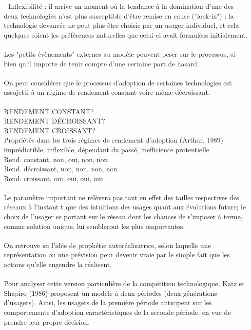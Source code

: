 \documentclass[a4paper, 10pt]{article}
\begin{document}
- Inflexibilité : il arrive un moment où la tendance à la domination d'une des deux technologies n'est plus susceptible d'être remise en cause ("lock-in") :
la technologie devancée ne peut plus être choisie par un usager individuel, et cela quelques soient les préférences naturelles que celui-ci avait formulées initialement.\\ \\
Les "petits évènements" externes au modèle peuvent peser sur le processus, si bien qu'il importe de tenir compte d'une certaine part de hasard.\\ \\
On peut considérer que le processus d'adoption de certaines technologies est assujetti à un régime de rendement constant voire même décroissant.\\ \\
RENDEMENT CONSTANT?\\
RENDEMENT DÉCROISSANT?\\
RENDEMENT CROISSANT?\\
Propriétés dans les trois régimes de rendement d'adoption (Arthur, 1989)\\
imprédictible, inflexible, dépendant du passé, inefficience protentielle\\
Rend. constant, non, oui, non, non\\
Rend. décroissant, non, non, non, non\\
Rend. croissant, oui, oui, oui, oui\\ \\
Le paramètre important ne relèvera pas tant en effet des tailles respectives des réseaux à l'instant t que des intuitions des usages quant aux évolutions future;
le choix de l'usager se portant sur le réseau dont les chances de s'imposer à terme, comme solution unique, lui sembleront les plus omportantes.\\ \\
On retrouve ici l'idée de prophétie autoréalisatrice, selon laquelle une représentation ou une prévision peut devenir vraie par le simple fait que les actions qu'elle engendre la réalisent.\\ \\
Pour analyser cette version particulière de la compétition technologique, Katz et Shapiro (1986) proposent un modèle à deux périodes (deux générations d'usagers).
Ainsi, les usagers de la première période anticipent sur les comportements d'adoption caractéristiques de la seconde période,
en vue de prendre leur propre décision.\\ \\
\end{document}
